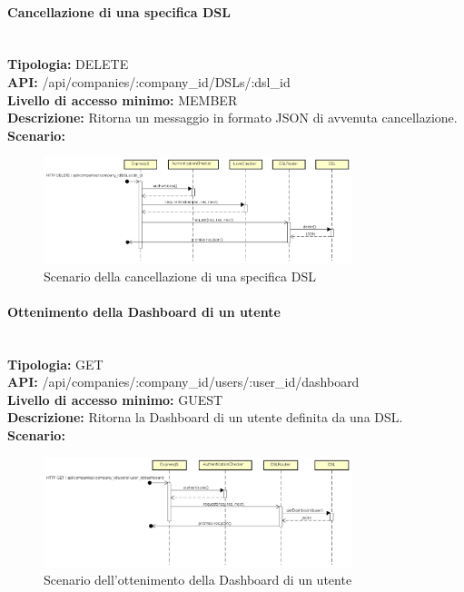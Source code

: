 \newpage
\paragraph{Cancellazione di una specifica DSL}\mbox{}\\
\textbf{Tipologia:} DELETE \\
\textbf{API:} /api/companies/:company\_id/DSLs/:dsl\_id \\
\textbf{Livello di accesso minimo:} MEMBER \\
\textbf{Descrizione:} Ritorna un messaggio in formato JSON di avvenuta cancellazione. \\
\textbf{Scenario:} 
\begin{figure}[H]
\centering
\includegraphics[width=0.8\textwidth]{res/sections/backend/sequence/(DELETE)dsl.png}
\caption{Scenario della cancellazione di una specifica DSL}
\end{figure}

\newpage
\paragraph{Ottenimento della Dashboard di un utente}\mbox{}\\
\textbf{Tipologia:} GET \\
\textbf{API:} /api/companies/:company\_id/users/:user\_id/dashboard \\
\textbf{Livello di accesso minimo:} GUEST \\
\textbf{Descrizione:} Ritorna la Dashboard di un utente definita da una DSL. \\
\textbf{Scenario:}  
\begin{figure}[H]
\centering
\includegraphics[width=0.8\textwidth]{res/sections/backend/sequence/(GET)dashboard.png}
\caption{Scenario dell'ottenimento della Dashboard di un utente}
\end{figure}

